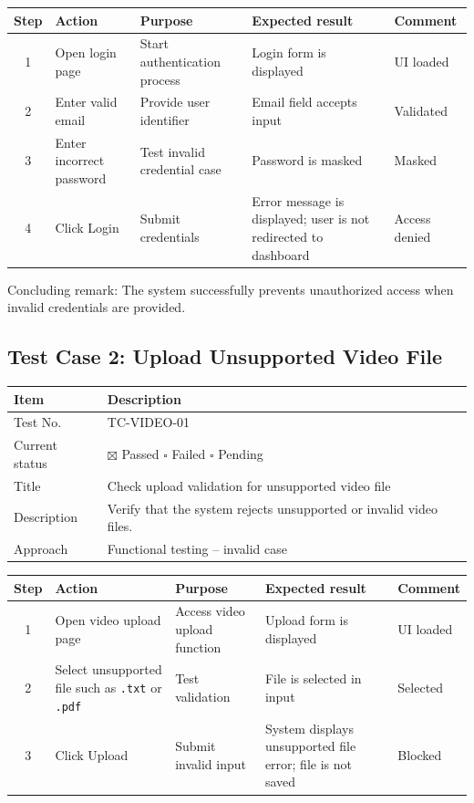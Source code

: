 \documentclass[12pt,a4paper]{report}
\begin{document}
\begin{longtable}{|c|p{3.5cm}|p{3.8cm}|p{4cm}|p{2cm}|}
\hline
\rowcolor{HeaderBlue}
\textbf{Step} & \textbf{Action} & \textbf{Purpose} & \textbf{Expected result} & \textbf{Comment} \\
\hline
1 & Open login page & Start authentication process & Login form is displayed & UI loaded \\
\hline
2 & Enter valid email & Provide user identifier & Email field accepts input & Validated \\
\hline
3 & Enter incorrect password & Test invalid credential case & Password is masked & Masked \\
\hline
4 & Click Login & Submit credentials & Error message is displayed; user is not redirected to dashboard & Access denied \\
\hline
\end{longtable}

Concluding remark: The system successfully prevents unauthorized access when invalid credentials are provided.

\subsection{Test Case 2: Upload Unsupported Video File}
\begin{longtable}{|p{4cm}|p{10cm}|}
\hline
\rowcolor{HeaderBlue}\textbf{Item} & \textbf{Description} \\
\hline
Test No. & TC-VIDEO-01 \\
\hline
Current status & $\boxtimes$ Passed \quad $\square$ Failed \quad $\square$ Pending \\
\hline
Title & Check upload validation for unsupported video file \\
\hline
Description & Verify that the system rejects unsupported or invalid video files. \\
\hline
Approach & Functional testing -- invalid case \\
\hline
\end{longtable}

\begin{longtable}{|c|p{3.5cm}|p{3.5cm}|p{4cm}|p{2cm}|}
\hline
\rowcolor{HeaderBlue}
\textbf{Step} & \textbf{Action} & \textbf{Purpose} & \textbf{Expected result} & \textbf{Comment} \\
\hline
1 & Open video upload page & Access video upload function & Upload form is displayed & UI loaded \\
\hline
2 & Select unsupported file such as \texttt{.txt} or \texttt{.pdf} & Test validation & File is selected in input & Selected \\
\hline
3 & Click Upload & Submit invalid input & System displays unsupported file error; file is not saved & Blocked \\
\hline
\end{longtable}
\end{document}
